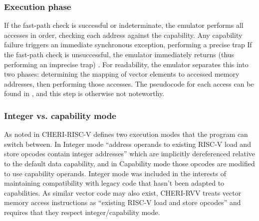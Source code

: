 \subsubsection{Execution phase}
If the fast-path check is successful or indeterminate, the emulator performs all accesses in order, checking each address against the capability.
Any capability failure triggers an immediate synchronous exception, performing a precise trap 
If the fast-path check is unsuccessful, the emulator immediately returns (thus performing an imprecise trap) .
For readability, the emulator separates this into two phases: determining the mapping of vector elements to accessed memory addresses, then performing those accesses.
The pseudocode for each access can be found in , and this step is otherwise not noteworthy.

\subsubsection{Integer vs. capability mode}\label{chap:emu:rvv_int_mode}
As noted in  CHERI-RISC-V defines two execution modes that the program can switch between.
In Integer mode \enquote{address operands to existing RISC-V load and store opcodes contain integer addresses} which are implicitly dereferenced relative to the default data capability, and in Capability mode those opcodes are modified to use capability operands.
Integer mode was included in the interests of maintaining compatibility with legacy code that hasn't been adapted to capabilities.
As similar vector code may also exist, CHERI-RVV treats vector memory access instructions as \enquote{existing RISC-V load and store opcodes} and requires that they respect integer/capability mode.